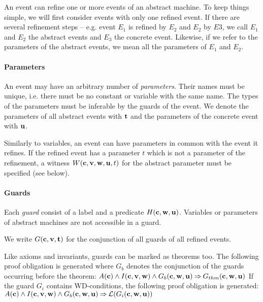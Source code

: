 An event can refine one or more events of an abstract machine. To keep things simple, we will
  first consider events with only one refined event.
If there are several refinement steps -- e.g. event $E_1$ is refined by $E_2$ and $E_2$ by
  $E3$, we call $E_1$ and $E_2$ the abstract events and $E_3$ the concrete event.
Likewise, if we refer to the parameters of the abstract events, we mean all the parameters
  of $E_1$ and $E_2$.

\paragraph{Parameters}
An event may have an arbitrary number of \emph{parameters}. Their names must be unique, i.e. there must be no constant or variable with the same name.
The types of the parameters must be inferable by the guards of the event.
We denote the parameters of all abstract events with $\mathbf{t}$ and the
parameters of the concrete event with $\mathbf{u}$.

Similarly to variables, an event can have parameters in common with the event it refines.
If the refined event has a parameter $t$ which is not a parameter of the refinement, 
a witness $W(\mathbf{c},{\mathbf{v},\mathbf{w}},\mathbf{u},t)$ for the abstract parameter must be specified (see below).

\paragraph{Guards}
Each \emph{guard} consist of a label and a predicate $H(\mathbf{c},\mathbf{w},\mathbf{u})$.
Variables or parameters of abstract machines are not accessible in a guard.

We write $G(\mathbf{c},\mathbf{v},\mathbf{t})$ for the conjunction of all guards of all refined events.

Like axioms and invariants, guards can be marked as theorems too. The following
proof obligation is generated where $G_b$ denotes the conjunction of the guards occurring before the theorem:
%
{$A(\mathbf{c}) \land I(\mathbf{c},\mathbf{v},\mathbf{w}) \land G_b(\mathbf{c},\mathbf{w},\mathbf{u}) 
\mathbin\Rightarrow G_{thm}(\mathbf{c},\mathbf{w},\mathbf{u})$}
If the guard $G_i$ contains WD-conditions, the following proof obligation is generated:
%
{$A(\mathbf{c}) \land I(\mathbf{c},\mathbf{v},\mathbf{w}) \land G_b(\mathbf{c},\mathbf{w},\mathbf{u}) 
\mathbin\Rightarrow \mathcal{L}(G_i(\mathbf{c},\mathbf{w},\mathbf{u}))$}



